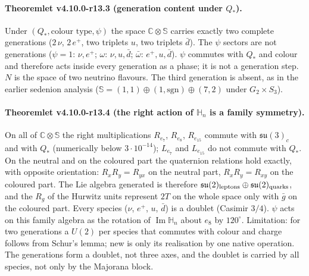 \paragraph{Theoremlet v4.10.0-r13.3 (generation content under \(Q_*\)).}
Under \((Q_*,\text{colour type},\psi)\) the space \(\mathbb C\otimes\mathbb S\) carries exactly two complete generations
(\(2\,\nu\), \(2\,e^+\), two triplets \(u\), two triplets \(\bar d\)).  The \(\psi\) sectors are not generations
(\(\psi=1\): \(\nu,e^+\); \(\omega\): \(\nu,u,\bar d\); \(\bar\omega\): \(e^+,u,\bar d\)).  \(\psi\) commutes with \(Q_*\) and colour
and therefore acts inside every generation as a phase; it is not a generation step.  \(N\) is the space of two neutrino
flavours.  The third generation is absent, as in the earlier sedenion analysis (\(\mathbb S=(1,1)\oplus(1,\mathrm{sgn})\oplus(7,2)\)
under \(G_2\times S_3\)).

\paragraph{Theoremlet v4.10.0-r13.4 (the right action of \(\mathbb H_n\) is a family symmetry).}
On all of \(\mathbb C\otimes\mathbb S\) the right multiplications \(R_{e_7}\), \(R_{e_8}\), \(R_{e_{15}}\) commute with
\(\mathfrak{su}(3)_c\) and with \(Q_*\) (numerically below \(3\cdot10^{-14}\)); \(L_{e_7}\) and \(L_{e_{15}}\) do not commute with
\(Q_*\).  On the neutral and on the coloured part the quaternion relations hold exactly, with opposite orientation:
\(R_xR_y=R_{yx}\) on the neutral part, \(R_xR_y=R_{xy}\) on the coloured part.  The Lie algebra generated is therefore
\(\mathfrak{su}(2)_{\rm leptons}\oplus\mathfrak{su}(2)_{\rm quarks}\), and the \(R_g\) of the Hurwitz units represent \(2T\) on the whole
space only with \(\bar g\) on the coloured part.  Every species (\(\nu\), \(e^+\), \(u\), \(\bar d\)) is a doublet (Casimir \(3/4\)).
\(\psi\) acts on this family algebra as the rotation of \(\operatorname{Im}\mathbb H_n\) about \(e_8\) by \(120^\circ\).
Limitation: for two generations a \(U(2)\) per species that commutes with colour and charge follows from Schur's lemma;
new is only its realisation by one native operation.  The generations form a doublet, not three axes, and the doublet is
carried by all species, not only by the Majorana block.

